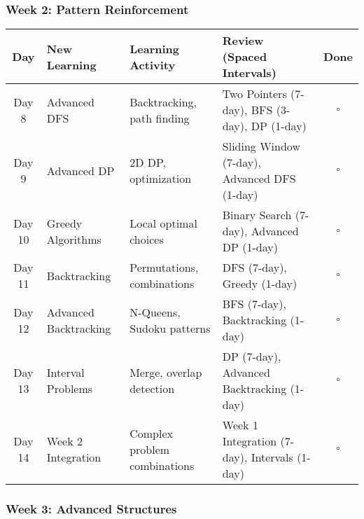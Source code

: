 \documentclass[10pt,a4paper]{article}
\begin{document}
\subsubsection{Week 2: Pattern Reinforcement}

\begin{table}[h]
\centering
\small
\begin{tabular}{|c|p{3cm}|p{4cm}|p{4cm}|c|}
\hline
\textbf{Day} & \textbf{New Learning} & \textbf{Learning Activity} & \textbf{Review (Spaced Intervals)} & \textbf{Done} \\
\hline
Day 8 & Advanced DFS & Backtracking, path finding & Two Pointers (7-day), BFS (3-day), DP (1-day) & $\square$ \\
\hline
Day 9 & Advanced DP & 2D DP, optimization & Sliding Window (7-day), Advanced DFS (1-day) & $\square$ \\
\hline
Day 10 & Greedy Algorithms & Local optimal choices & Binary Search (7-day), Advanced DP (1-day) & $\square$ \\
\hline
Day 11 & Backtracking & Permutations, combinations & DFS (7-day), Greedy (1-day) & $\square$ \\
\hline
Day 12 & Advanced Backtracking & N-Queens, Sudoku patterns & BFS (7-day), Backtracking (1-day) & $\square$ \\
\hline
Day 13 & Interval Problems & Merge, overlap detection & DP (7-day), Advanced Backtracking (1-day) & $\square$ \\
\hline
Day 14 & Week 2 Integration & Complex problem combinations & Week 1 Integration (7-day), Intervals (1-day) & $\square$ \\
\hline
\end{tabular}
\end{table}

\subsubsection{Week 3: Advanced Structures}
\end{document}
